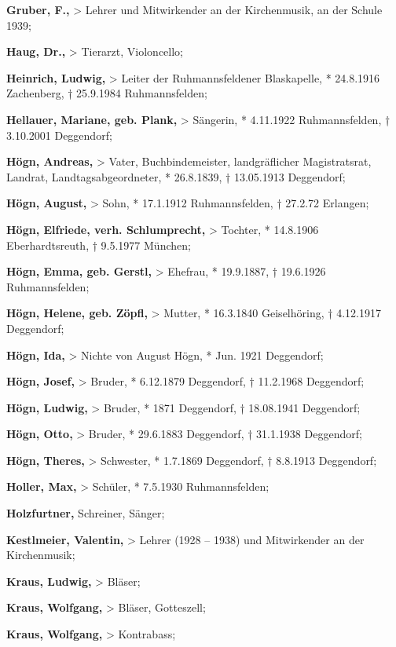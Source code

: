 \textbf{Gruber, F.,} {\textgreater} Lehrer und Mitwirkender an der
Kirchenmusik, an der Schule 1939;

\textbf{Haug, Dr.,} {\textgreater} Tierarzt, Violoncello;

\textbf{Heinrich, Ludwig,} {\textgreater} Leiter der Ruhmannsfeldener
Blaskapelle, * 24.8.1916 Zachenberg, † 25.9.1984 Ruhmannsfelden;

\textbf{Hellauer, Mariane, geb. Plank,} {\textgreater} Sängerin, *
4.11.1922 Ruhmannsfelden, † 3.10.2001 Deggendorf;

\textbf{Högn, Andreas,} {\textgreater} Vater, Buchbindemeister,
landgräflicher Magistratsrat, Landrat, Landtagsabgeordneter, *
26.8.1839, † 13.05.1913 Deggendorf;

\textbf{Högn, August,} {\textgreater} Sohn, * 17.1.1912 Ruhmannsfelden,
† 27.2.72 Erlangen;

\textbf{Högn, Elfriede, verh. Schlumprecht, }{\textgreater} Tochter, *
14.8.1906 Eberhardtsreuth, † 9.5.1977 München;

\textbf{Högn, Emma, geb. Gerstl,} {\textgreater} Ehefrau, * 19.9.1887, †
19.6.1926 Ruhmannsfelden;

\textbf{Högn, Helene, geb. Zöpfl,} {\textgreater} Mutter, * 16.3.1840
Geiselhöring, † 4.12.1917 Deggendorf;

\textbf{Högn, Ida,} {\textgreater} Nichte von August Högn, * Jun. 1921
Deggendorf;

\textbf{Högn, Josef,} {\textgreater} Bruder, * 6.12.1879 Deggendorf, †
11.2.1968 Deggendorf;

\textbf{Högn, Ludwig, }{\textgreater} Bruder,\textbf{ }* 1871
Deggendorf, † 18.08.1941 Deggendorf;

\textbf{Högn, Otto,} {\textgreater} Bruder, * 29.6.1883 Deggendorf, †
31.1.1938 Deggendorf;

\textbf{Högn, Theres,} {\textgreater} Schwester, * 1.7.1869 Deggendorf,
† 8.8.1913 Deggendorf;

\textbf{Holler, Max,} {\textgreater} Schüler, * 7.5.1930 Ruhmannsfelden;

\textbf{Holzfurtner,} Schreiner, Sänger;

\textbf{Kestlmeier, Valentin,} {\textgreater} Lehrer (1928 – 1938) und
Mitwirkender an der Kirchenmusik;

\textbf{Kraus, Ludwig,} {\textgreater} Bläser;

\textbf{Kraus, Wolfgang,} {\textgreater} Bläser, Gotteszell;

\textbf{Kraus, Wolfgang,} {\textgreater} Kontrabass;

